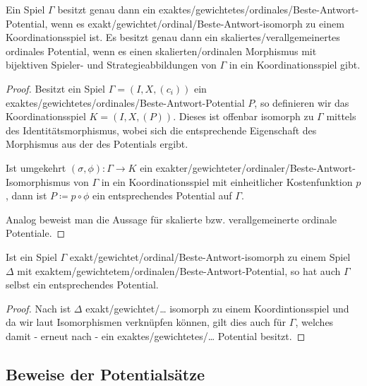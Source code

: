 \begin{prop}\label{prop:CharPotentialeDurchIsos}
	Ein Spiel $\Gamma$ besitzt genau dann ein exaktes/gewichtetes/ordinales/Beste-Antwort-Potential, wenn es exakt/gewichtet/ordinal/Beste-Antwort-isomorph zu einem Koordinationsspiel ist. Es besitzt genau dann ein skaliertes/verallgemeinertes ordinales Potential, wenn es einen skalierten/ordinalen Morphismus mit bijektiven Spieler- und Strategieabbildungen von $\Gamma$ in ein Koordinationsspiel gibt.
\end{prop}

\begin{proof}
	Besitzt ein Spiel $\Gamma= (I, X, (c_i))$ ein exaktes/gewichtetes/ordinales/Beste-Antwort-Potential $P$, so definieren wir das Koordinationsspiel $K = (I, X, (P))$. Dieses ist offenbar isomorph zu $\Gamma$ mittels des Identitätsmorphismus, wobei sich die entsprechende Eigenschaft des Morphismus aus der des Potentials ergibt.
	
	Ist umgekehrt $(\sigma, \phi): \Gamma \to K$ ein exakter/gewichteter/ordinaler/Beste-Antwort-Isomorphismus von $\Gamma$ in ein Koordinationsspiel mit einheitlicher Kostenfunktion $p$, dann ist $P \coloneqq p \circ \phi$ ein entsprechendes Potential auf $\Gamma$.
	
	Analog beweist man die Aussage für skalierte bzw. verallgemeinerte ordinale Potentiale.
\end{proof}

\begin{kor}\label{kor:PotentialeDurchIsosUebertragen}
	Ist ein Spiel $\Gamma$ exakt/gewichtet/ordinal/Beste-Antwort-isomorph zu einem Spiel $\Delta$ mit exaktem/gewichtetem/ordinalen/Beste-Antwort-Potential, so hat auch $\Gamma$ selbst ein entsprechendes Potential.
\end{kor}

\begin{proof}
	Nach  ist $\Delta$ exakt/gewichtet/\dots{} isomorph zu einem Koordintionsspiel und da wir laut  Isomorphismen verknüpfen können, gilt dies auch für $\Gamma$, welches damit - erneut nach  - ein exaktes/gewichtetes/\dots{} Potential besitzt.
\end{proof}


\subsection{Beweise der Potentialsätze}\label{sec:Morphismen:Potentialsaetze}

